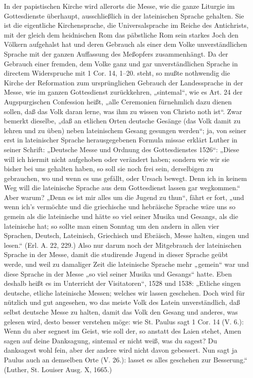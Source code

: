 In der papistischen Kirche wird allerorts die Messe, wie die ganze Liturgie im Gottesdienste überhaupt, ausschließlich in der lateinischen Sprache gehalten. Sie ist die eigentliche Kirchensprache, die Universalsprache im Reiche des Antichrists, mit der gleich dem heidnischen Rom das päbstliche Rom sein starkes Joch den Völkern aufgehalst hat und deren Gebrauch als einer dem Volke unverständlichen Sprache mit der ganzen Auffassung des Meßopfers zusammenhängt. Da der Gebrauch einer fremden, dem Volke ganz und gar unverständlichen Sprache in directem Widerspruche mit 1 Cor. 14, 1–20. steht, so mußte nothwendig die Kirche der Reformation zum ursprünglichen Gebrauch der Landessprache in der Messe, wie im ganzen Gottesdienst zurückkehren, „sintemal“,
wie es Art. 24 der Augspurgischen Confession heißt, „alle Ceremonien fürnehmlich dazu dienen sollen, daß das Volk daran lerne, was ihm zu wissen von Christo noth ist“. Zwar bemerkt dieselbe, „daß an etlichen Orten deutsche Gesänge (das Volk damit zu lehren und zu üben) neben lateinischem Gesang gesungen werden“; ja, von seiner erst in lateinischer Sprache herausgegebenen Formula missae erklärt Luther in seiner Schrift: „Deutsche Messe und Ordnung des Gottesdienstes 1526“: „Diese will ich hiermit nicht aufgehoben oder verändert haben; sondern wie wir sie bisher bei uns gehalten haben, so soll sie noch frei sein, derselbigen zu gebrauchen, wo und wenn es uns gefällt, oder Ursach bewegt. Denn ich in keinem Weg will die lateinische Sprache aus dem Gottesdienst lassen gar wegkommen.“ Aber warum? „Denn es ist mir alles um die Jugend zu thun“, fährt er fort, „und wenn ich’s vermöchte und die griechische und hebräische Sprache wäre uns so gemein als die lateinische und hätte so viel seiner Musika und Gesangs, als die lateinische hat; so sollte man einen Sonntag um den andern in allen vier Sprachen, Deutsch, Lateinisch, Griechisch und Ebräisch, Messe halten, singen und lesen.“ (Erl. A. 22, 229.) Also nur darum noch der Mitgebrauch der lateinischen Sprache in der Messe, damit die studirende Jugend in dieser Sprache geübt werde, und weil zu damaliger Zeit die lateinische Sprache mehr „gemein“ war und diese Sprache in der Messe „so viel seiner Musika und Gesangs“ hatte. Eben deshalb heißt es im Unterricht der Visitatoren“, 1528 und 1538: „Etliche singen deutsche, etliche lateinische Messen; welches wir lassen geschehen. Doch wird für nützlich und gut angesehen, wo das meiste Volk des Latein unverständlich, daß selbst deutsche Messe zu halten, damit das Volk den Gesang und anderes, was gelesen wird, desto besser verstehen möge: wie St. Paulus sagt 1 Cor. 14 (V. 6.): Wenn du aber segnest im Geist, wie soll der, so anstatt des Laien stehet, Amen sagen auf deine Danksagung, sintemal er nicht weiß, was du sagest? Du danksagest wohl fein, aber der andere wird nicht davon gebessert. Nun sagt ja Paulus auch an demselben Orte (V. 26.): lasset es alles geschehen zur Besserung.“ (Luther, St. Louiser Ausg. X, 1665.)

